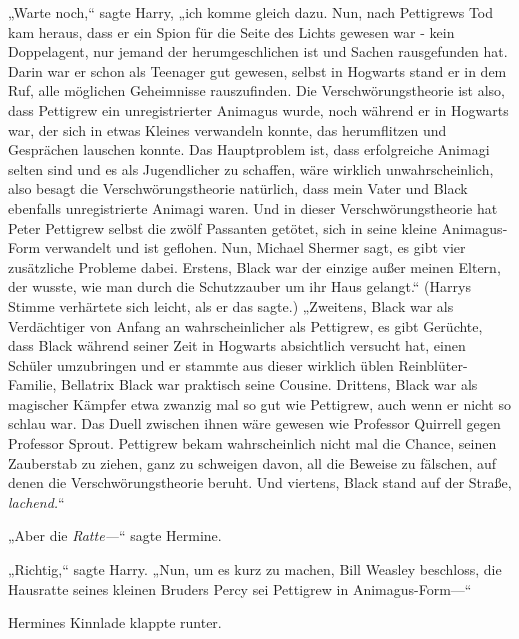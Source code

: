 „Warte noch,“ sagte Harry, „ich komme gleich dazu. Nun, nach Pettigrews Tod kam heraus, dass er ein Spion für die Seite des Lichts gewesen war - kein Doppelagent, nur jemand der herumgeschlichen ist und Sachen rausgefunden hat. Darin war er schon als Teenager gut gewesen, selbst in Hogwarts stand er in dem Ruf, alle möglichen Geheimnisse rauszufinden. Die Verschwörungstheorie ist also, dass Pettigrew ein unregistrierter Animagus wurde, noch während er in Hogwarts war, der sich in etwas Kleines verwandeln konnte, das herumflitzen und Gesprächen lauschen konnte. Das Hauptproblem ist, dass erfolgreiche Animagi selten sind und es als Jugendlicher zu schaffen, wäre wirklich unwahrscheinlich, also besagt die Verschwörungstheorie natürlich, dass mein Vater und Black ebenfalls unregistrierte Animagi waren. Und in dieser Verschwörungstheorie hat Peter Pettigrew selbst die zwölf Passanten getötet, sich in seine kleine Animagus-Form verwandelt und ist geflohen. Nun, Michael Shermer sagt, es gibt vier zusätzliche Probleme dabei. Erstens, Black war der einzige außer meinen Eltern, der wusste, wie man durch die Schutzzauber um ihr Haus gelangt.“ (Harrys Stimme verhärtete sich leicht, als er das sagte.) „Zweitens, Black war als Verdächtiger von Anfang an wahrscheinlicher als Pettigrew, es gibt Gerüchte, dass Black während seiner Zeit in Hogwarts absichtlich versucht hat, einen Schüler umzubringen und er stammte aus dieser wirklich üblen Reinblüter-Familie, Bellatrix Black war praktisch seine Cousine. Drittens, Black war als magischer Kämpfer etwa zwanzig mal so gut wie Pettigrew, auch wenn er nicht so schlau war. Das Duell zwischen ihnen wäre gewesen wie Professor Quirrell gegen Professor Sprout. Pettigrew bekam wahrscheinlich nicht mal die Chance, seinen Zauberstab zu ziehen, ganz zu schweigen davon, all die Beweise zu fälschen, auf denen die Verschwörungstheorie beruht. Und viertens, Black stand auf der Straße, \emph{lachend.}“

„Aber die \emph{Ratte—}“ sagte Hermine.

„Richtig,“ sagte Harry. „Nun, um es kurz zu machen, Bill Weasley beschloss, die Hausratte seines kleinen Bruders Percy sei Pettigrew in Animagus-Form—“

Hermines Kinnlade klappte runter.

